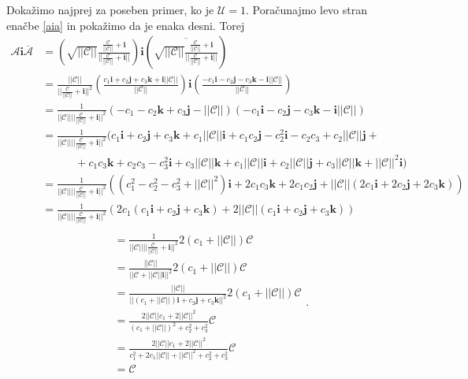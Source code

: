 \documentclass[mat1]{fmfdelo}
\newcommand{\ii}{\boldsymbol i}
\newcommand{\jj}{\boldsymbol j}
\newcommand{\kk}{\boldsymbol k}
\newcommand{\A}{\mathcal A}
\newcommand{\CC}{\mathcal C}
\begin{document}
\begin{dokaz}
	Dokažimo najprej za poseben primer, ko je $\mathcal{U} = 1$.
	Poračunajmo levo stran enačbe \ref{aia} in pokažimo da je enaka desni.
	Torej 
	\begin{equation*}
				\begin{split}
				\A \ii \overline{\A} &= \left(\sqrt{||\CC||} \frac{\frac{\CC}{||\CC||} + \ii}{||\frac{\CC}{||\CC||} + \ii||}\right) \ii \left(\overline{\sqrt{||\CC||} \frac{\frac{\CC}{||\CC||} + \ii}{||\frac{\CC}{||\CC||} + \ii||}}\right) \\
		&= \frac{||\CC||}{||\frac{\CC}{||\CC||} + \ii||^2} \left(\frac{c_1 \ii + c_2 \jj + c_3 \kk + \ii ||\CC||}{||\CC||}\right)\ii \left(\frac{-c_1\ii-c_2\jj-c_3\kk-\ii||\CC||}{||\CC||}\right) \\
		&= \frac{1}{||\CC||||\frac{\CC}{||\CC||} + \ii||^2} \left(-c_1  - c_2 \kk + c_3 \jj -  ||\CC||\right) \left(-c_1\ii-c_2\jj-c_3\kk-\ii||\CC||\right) \\
		&=\frac{1}{||\CC||||\frac{\CC}{||\CC||} + \ii||^2} ( c_1\ii + c_2\jj + c_3\kk + c_1||\CC||\ii
		+c_1c_2\jj-c_2^2\ii-c_2c_3+c_2||\CC||\jj+\\
		&\quad\quad\quad+c_1c_3\kk+c_2c_3-c_3^2\ii+c_3||\CC||\kk+c_1||\CC||\ii+c_2||\CC||\jj+c_3||\CC||\kk+||\CC||^2\ii )\\
		&=\frac{1}{||\CC||||\frac{\CC}{||\CC||} + \ii||^2}\left((c_1^2-c_2^2-c_3^2+||\CC||^2)\ii + 2c_1c_3\kk+2c_1c_2\jj + ||\CC||(2c_1\ii+2c_2\jj+2c_3\kk)\right)\\
		&=\frac{1}{||\CC||||\frac{\CC}{||\CC||} + \ii||^2}\left(2c_1(c_1\ii+c_2\jj+c_3\kk) + 2||\CC||(c_1\ii+c_2\jj+c_3\kk)\right)\\
		\end{split}
		\end{equation*}
		\begin{equation*}
		\begin{split}
		&=\frac{1}{||\CC||||\frac{\CC}{||\CC||} + \ii||^2}2(c_1+||\CC||)\CC \\
		&=\frac{||\CC||}{||\CC + ||\CC||\ii||^2}2(c_1+||\CC||)\CC \\
		&=\frac{||\CC||}{||(c_1 + ||\CC||)\ii+c_2\jj+c_3\kk||^2}2(c_1+||\CC||)\CC \\
		&=\frac{2||\CC||c_1+2||\CC||^2}{(c_1+||\CC||)^2+c_2^2+c_3^2}\CC \\
		&=\frac{2||\CC||c_1+2||\CC||^2}{c_1^2+2c_1||\CC|| + ||\CC||^2+c_2^2+c_3^2}\CC \\
		&=\CC
				\end{split}.
	\end{equation*}

\end{dokaz}
\end{document}
